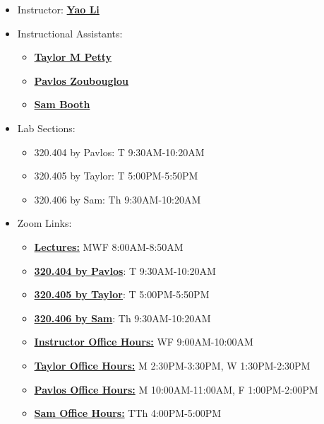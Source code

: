 \documentclass[
]{article}
\providecommand{\tightlist}{%
  \setlength{\itemsep}{0pt}\setlength{\parskip}{0pt}}
\begin{document}
\begin{itemize}
\item
  Instructor: \textbf{\href{https://liyao880.github.io/yaoli/}{Yao Li}}
\item
  Instructional Assistants:

  \begin{itemize}
  \tightlist
  \item
    \textbf{\href{http://stat-or.unc.edu/people/graduate-students-department}{Taylor
    M Petty}}
  \item
    \textbf{\href{http://stat-or.unc.edu/people/graduate-students-department}{Pavlos
    Zoubouglou}}
  \item
    \textbf{\href{http://stat-or.unc.edu/people/graduate-students-department}{Sam
    Booth}}
  \end{itemize}
\item
  Lab Sections:

  \begin{itemize}
  \tightlist
  \item
    320.404 by Pavlos: T 9:30AM-10:20AM
  \item
    320.405 by Taylor: T 5:00PM-5:50PM
  \item
    320.406 by Sam: Th 9:30AM-10:20AM
  \end{itemize}
\item
  Zoom Links:

  \begin{itemize}
  \tightlist
  \item
    \textbf{\href{https://unc.zoom.us/j/93501182856?pwd=b3ZoZlZTdndrYW95MGswTEpGSU1qdz09}{Lectures:}}
    MWF 8:00AM-8:50AM
  \item
    \textbf{\href{https://unc.zoom.us/j/96678226561}{320.404 by
    Pavlos}}: T 9:30AM-10:20AM
  \item
    \textbf{\href{https://unc.zoom.us/j/91440986085?pwd=WUpKeW5hVG0rNGRXaXlZZStJL2xuUT09}{320.405
    by Taylor}}: T 5:00PM-5:50PM
  \item
    \textbf{\href{https://unc.zoom.us/j/5891075192}{320.406 by Sam}}: Th
    9:30AM-10:20AM
  \item
    \textbf{\href{https://unc.zoom.us/j/99751369535}{Instructor Office
    Hours:}} WF 9:00AM-10:00AM
  \item
    \textbf{\href{https://unc.zoom.us/j/91440986085?pwd=WUpKeW5hVG0rNGRXaXlZZStJL2xuUT09}{Taylor
    Office Hours:}} M 2:30PM-3:30PM, W 1:30PM-2:30PM
  \item
    \textbf{\href{https://unc.zoom.us/j/2903979720}{Pavlos Office
    Hours:}} M 10:00AM-11:00AM, F 1:00PM-2:00PM
  \item
    \textbf{\href{https://unc.zoom.us/j/5891075192}{Sam Office Hours:}}
    TTh 4:00PM-5:00PM
  \end{itemize}
\end{itemize}
\end{document}
